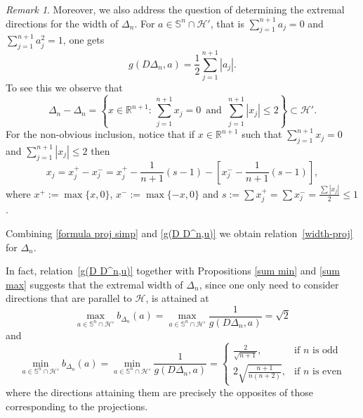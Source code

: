 \documentclass[10pt]{amsart}
\newcommand{\ls}{\leqslant}
\newcommand{\1}{\textbf{1}}
\numberwithin{equation}{section} %
\theoremstyle{remark}
\newtheorem{remark}[theorem]{Remark}
\theoremstyle{definition}
\begin{document}
\begin{remark}
 Moreover, we also address the question of determining the extremal directions for the width of $\Delta_n$. For  $a\in \mathbb{S}^{n}\cap \mathcal{H}'$, that is $\sum_{j=1}^{n+1}a_j=0$ and $\sum_{j=1}^{n+1}a_j^2=1$, one gets 
\begin{equation}\label{g(D D^n,u)}
g(D\Delta_n,a)=\frac{1}{2}\sum_{j=1}^{n+1}|a_j|.
\end{equation}
To see this we observe that 
\begin{equation}\label{D^n-D^n}
\Delta_n-\Delta_n=\left \{x\in \mathbb{R}^{n+1}:\, \sum_{j=1}^{n+1}x_j=0 \,\,\,\text{and}\,\,\, \sum_{j=1}^{n+1}|x_j|\ls2 \right\} \subset \mathcal{H}'.
\end{equation}
For the non-obvious inclusion, notice that if $x\in \mathbb{R}^{n+1}$ such that $\sum_{j=1}^{n+1}x_j=0$ and $\sum_{j=1}^{n+1}|x_j|\ls2$ then $$x_j=x_j^{+}-x_j^{-}=x_j^{+}-\frac{1}{n+1}(s-1)-[x_j^{-}-\frac{1}{n+1}(s-1)],$$ where $x^{+}:=\max\{x,0\}$, $x^{-}:=\max\{-x,0 \}$ and $s:=\sum x_j^{+}=\sum x_j^{-}=\frac{\sum|x_j|}{2}\ls1$. 

Combining \eqref{formula proj simp} and \eqref{g(D D^n,u)} we obtain relation~\eqref{width-proj} for $\Delta_n$.


In fact, relation~\ref{g(D D^n,u)} together with Propositions \ref{sum min} and \ref{sum max}  suggests that the extremal width of $\Delta_n$, since one only need to consider directions that are parallel to $\mathcal{H}$, is attained at
    \[
    \max_{a\in \mathbb{S}^{n}\cap \mathcal{H}'}b_{\Delta_n}(a)=\max_{a\in \mathbb{S}^{n}\cap \mathcal{H}'}\frac{1}{g(D\Delta_n,a)}= \sqrt{2}
    \]
    and 
    \[
    \min_{a\in \mathbb{S}^{n}\cap \mathcal{H}'} b_{\Delta_n}(a)=\min_{a\in \mathbb{S}^{n}\cap \mathcal{H}'}\frac{1}{g(D\Delta_n,a)} =\begin{cases} \frac{2}{\sqrt{n+1}}, & \text{if } n \text{ is odd} \\ 2\sqrt{\frac{n+1}{n(n+2)}}, & \text{if } n \text{ is even} \end{cases} 
    \]
   where the directions attaining them are precisely the opposites of those corresponding to the projections.
\end{remark}
\end{document}
